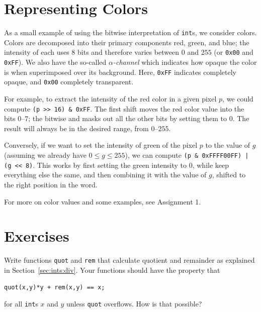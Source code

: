 \section{Representing Colors}
\label{sec:ints:colors}

As a small example of using the bitwise interpretation of
\lstinline'int's, we consider colors.  Colors are decomposed into
their primary components red, green, and blue; the intensity of each
uses 8 bits and therefore varies between $0$ and $255$ (or
\lstinline'0x00' and \lstinline'0xFF').  We also have the so-called
\emph{$\alpha$-channel} which indicates how opaque the color is when
superimposed over its background.  Here, \lstinline'0xFF' indicates
completely opaque, and \lstinline'0x00' completely transparent.

\begin{example}
For example, to extract the intensity of the red color in a given
pixel $p$, we could compute \lstinline'(p >> 16) & 0xFF'.  The first shift
moves the red color value into the bits $0$--$7$; the bitwise and
masks out all the other bits by setting them to $0$.  The result will
always be in the desired range, from $0$--$255$.

Conversely, if we want to set the intensity of green of the pixel $p$
to the value of $g$ (assuming we already have $0 \leq g \leq 255$), we
can compute \lstinline'(p & 0xFFFF00FF) | (g << 8)'.  This works by first
setting the green intensity to $0$, while keep everything else the same,
and then combining it with the value of $g$, shifted to the right
position in the word.

For more on color values and some examples, see Assignment 1.
\end{example}

\clearpage
\section{Exercises}
\label{sec:ints:exercises}

\begin{exercise}\label{ex:ints:quotrem}
  Write functions \lstinline'quot' and \lstinline'rem' that calculate quotient
  and remainder as explained in Section~\ref{sec:ints:div}.  Your functions
  should have the property that
\begin{lstlisting}[language={[C0]C}]
quot(x,y)*y + rem(x,y) == x;
\end{lstlisting}
for all \lstinline'int's $x$ and $y$ unless \lstinline'quot'
overflows.  How is that possible?
\end{exercise}

